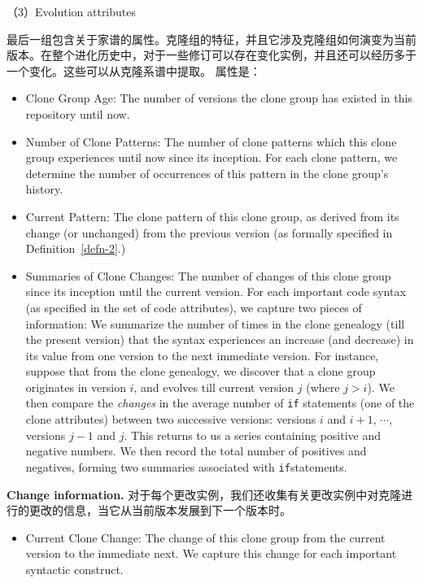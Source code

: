 （3）Evolution attributes

最后一组包含关于家谱的属性。克隆组的特征，并且它涉及克隆组如何演变为当前版本。在整个进化历史中，对于一些修订可以存在变化实例，并且还可以经历多于一个变化。这些可以从克隆系谱中提取。 属性是：

\begin{itemize}
\item Clone Group Age: 
The number of versions the clone group has existed in this repository until now.

\item Number of Clone Patterns: 
The number of clone patterns which this clone group experiences until now since its inception. 
For each clone pattern, we determine the number of occurrences of this pattern in the clone group's history.

\item Current Pattern: 
The clone pattern of this clone group, as derived from its change (or unchanged) from the previous version (as formally specified in Definition~\ref{defn-2}.)

\item Summaries of Clone Changes: 
The number of changes of this clone group since its inception until the current version.
For each important code syntax (as specified in the set of code attributes), we capture two pieces of information: We summarize the number of times in the clone genealogy (till the present version) that the syntax experiences an increase (and decrease) in its value from one version to the next immediate version. 
For instance, suppose that from the clone genealogy, we discover that a clone group originates in version $i$, and evolves till current version $j$ (where $j > i$). 
We then compare the {\em changes} in the average number of \verb+if+ statements (one of the clone attributes) between two successive versions: versions $i$ and $i+1$, $\cdots$, versions  $j-1$ and $j$. 
This returns to us a series containing positive and negative numbers.
We then record the total number of positives and negatives, forming two summaries associated with \verb+if+statements.

\end{itemize}

\noindent
{\bf Change information.} 
对于每个更改实例，我们还收集有关更改实例中对克隆进行的更改的信息，当它从当前版本发展到下一个版本时。

\begin{itemize}
\item Current Clone Change: 
The change of this clone group from the current version to the immediate next.  
We capture this change for each important syntactic construct.
\end{itemize}


